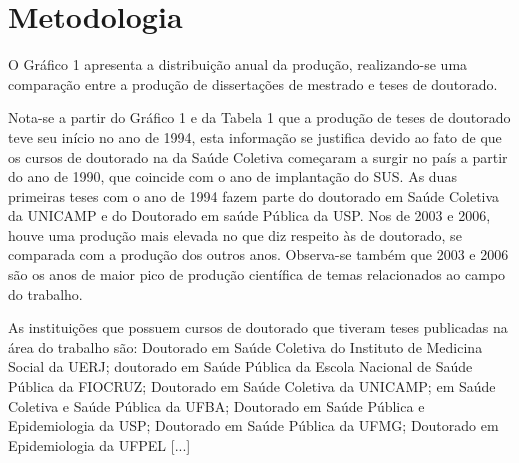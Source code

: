 \chapter{Metodologia}
\label{chap:metodologia}

O Gráfico 1 apresenta a distribuição anual da produção, realizando-se uma comparação entre a produção de dissertações de mestrado e teses de doutorado.

    \begin{figure}[h!]
    	\centering
    	\label{fig_mapa-3}
    \end{figure}

Nota-se a partir do Gráfico 1 e da Tabela 1 que a produção de teses de doutorado teve seu início no ano de 1994, esta informação se justifica devido ao fato de que os cursos de doutorado na  da Saúde Coletiva começaram a surgir no país a partir do ano de 1990, que coincide com o ano de implantação do SUS. As duas primeiras teses com o ano de 1994 fazem parte do doutorado em Saúde Coletiva da UNICAMP e do Doutorado em saúde Pública da USP. Nos  de 2003 e 2006, houve uma produção mais elevada no que diz respeito às  de doutorado, se comparada com a produção dos outros anos. Observa-se também que 2003 e 2006 são os anos de maior pico de produção científica de temas relacionados ao campo do trabalho.

As instituições que possuem cursos de doutorado que tiveram teses publicadas na área do trabalho são: Doutorado em Saúde Coletiva do Instituto de Medicina Social da UERJ; doutorado em Saúde Pública da Escola Nacional de Saúde Pública da FIOCRUZ; Doutorado em Saúde Coletiva da UNICAMP;  em Saúde Coletiva e Saúde Pública da UFBA; Doutorado em Saúde Pública e Epidemiologia da USP; Doutorado em Saúde Pública da UFMG; Doutorado em Epidemiologia da UFPEL [...]

